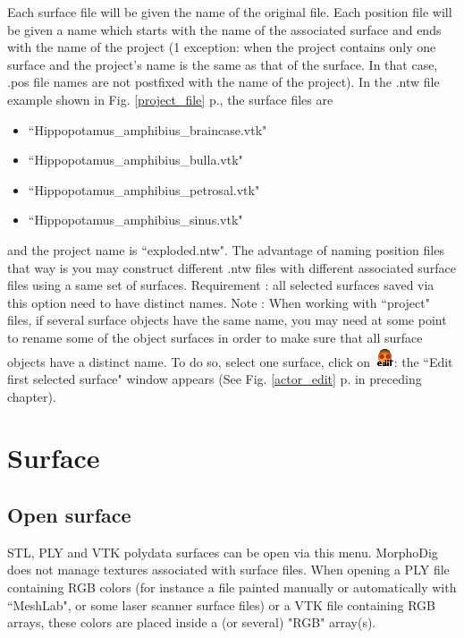 Each surface file will be given the name of the original file. Each position file will be given a name which starts with the name of the associated surface and ends with the name of the project (1 exception: when the project contains only one surface and  the project's name is the same as that of the surface. In that case, .pos file names are not postfixed with the name of the project). In the .ntw file example shown in Fig. \ref{project_file} p.\pageref{project_file}, the surface files are 
\begin{itemize}
\item ``Hippopotamus\_amphibius\_braincase.vtk" 
\item ``Hippopotamus\_amphibius\_bulla.vtk" 
\item ``Hippopotamus\_amphibius\_petrosal.vtk" 
\item ``Hippopotamus\_amphibius\_sinus.vtk" 
\end{itemize}
\noindent and the project name is ``exploded.ntw". The advantage of naming position files that way is you may construct different .ntw files with different associated surface files using a same set of surfaces. Requirement : all selected surfaces saved via this option
need to have distinct names. Note : When working with ``project" files, if several surface objects have the same name, you may need at
some point to rename some of the object surfaces in order to make sure that all surface objects have a distinct name. To do so, select one surface, click on \includegraphics[scale=0.7]{images/06/objects/actor_edit.png}: the ``Edit first selected surface" window appears (See Fig. \ref{actor_edit} p.\pageref{actor_edit} in preceding chapter).




\section{Surface}
\subsection{Open surface}
STL, PLY and VTK polydata surfaces can be open via this menu. MorphoDig does not manage textures associated with surface files. When opening a PLY file containing RGB colors (for instance a file painted manually or automatically with ``MeshLab", or some laser scanner surface files) or a VTK file containing RGB arrays, these colors are placed inside a (or several) "RGB" array(s). 

